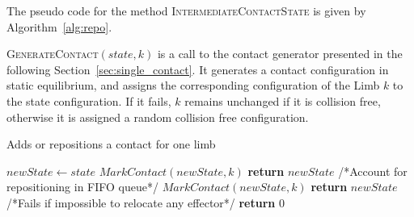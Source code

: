 The pseudo code for the method \textsc{IntermediateContactState} is given by Algorithm~\ref{alg:repo}.


\textsc{GenerateContact}$(state,k)$ is a call to the contact generator presented in the following Section~\ref{sec:single_contact}.
It generates a contact configuration in static equilibrium, and assigns the corresponding configuration of the Limb $k$ to the state configuration.
If it fails, $k$ remains unchanged if it is collision free, otherwise it is assigned a random collision free configuration.



\begin{algorithm}[!tbp]
\caption{Adds or repositions a contact for one limb} \label{interpolate}
	\begin{algorithmic}[1]
        \State $newState \gets state$
				\State $MarkContact(newState,k)$			
				\State \textbf{return} $newState$
			\EndIf
		\EndFor
				\State /*Account for repositioning in FIFO queue*/		
				\State $MarkContact(newState,k)$
				\State \textbf{return} $newState$
			\EndIf
		\EndFor
        \State
		/*Fails if impossible to relocate any effector*/
		\State \textbf{return} $0$
	\EndFunction
\end{algorithmic}
\label{alg:repo}
\end{algorithm}

